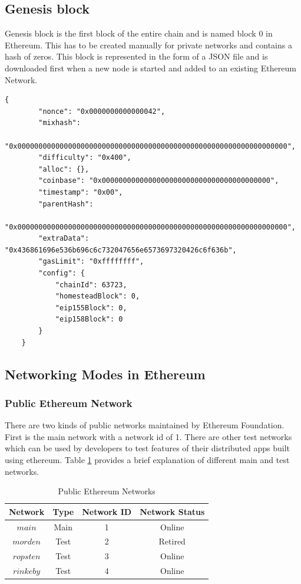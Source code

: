 \documentclass[11pt,openright]{report}
\begin{document}
\subsection{Genesis block}
Genesis block is the first block of the entire chain and is named block 0 in Ethereum. This has to be created manually for private networks and contains a hash of zeros. This block is represented in the form of a JSON file and is downloaded first when a new node is started and added to an existing Ethereum Network.

\begin{lstlisting}[basicstyle=\small,]
    {
        "nonce": "0x0000000000000042",
        "mixhash": 
        "0x0000000000000000000000000000000000000000000000000000000000000000",
        "difficulty": "0x400",
        "alloc": {}, 
        "coinbase": "0x0000000000000000000000000000000000000000",
        "timestamp": "0x00",
        "parentHash": 
        "0x0000000000000000000000000000000000000000000000000000000000000000",
        "extraData": "0x436861696e536b696c6c732047656e6573697320426c6f636b",
        "gasLimit": "0xffffffff",
        "config": {
            "chainId": 63723,
            "homesteadBlock": 0,
            "eip155Block": 0,
            "eip158Block": 0
        }
    }
\end{lstlisting}

\subsection{Networking Modes in Ethereum}
\subsubsection{Public Ethereum Network}
There are two kinds of public networks maintained by Ethereum Foundation. 
First is the main network with a network id of 1. There are other test networks which can be used by developers to test features of their distributed apps built using ethereum. Table \ref{pub_eth_networks} provides a brief explanation of different main and test networks. 


\begin{table}[!htbp]
	\renewcommand{\arraystretch}{1.3}
	\caption{Public Ethereum Networks}
	\label{pub_eth_networks}
	\centering
	\begin{tabular}{|c||c|c|c|}
		\hline
		\bfseries Network & \bfseries Type & \bfseries Network ID & \bfseries Network Status \\
		\hline\hline
		$main$ & Main & 1 & Online \\ \hline
		$morden$ & Test & 2 & Retired \\ \hline
		$ropsten$ & Test & 3 & Online \\ \hline
		$rinkeby$ & Test & 4 & Online \\ \hline
	\end{tabular}
\end{table}
\end{document}
